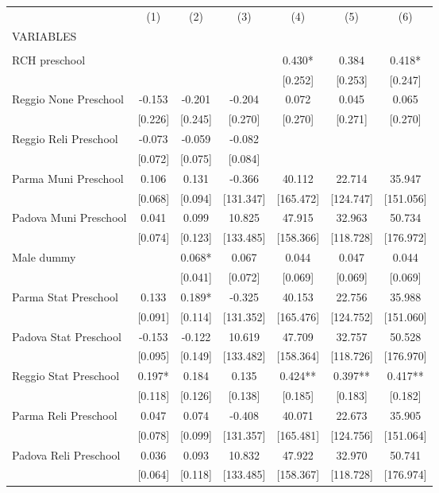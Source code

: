 \begin{tabular}{lcccccc} \hline
 & (1) & (2) & (3) & (4) & (5) & (6) \\
VARIABLES &  &  &  &  &  &  \\ \hline
 &  &  &  &  &  &  \\
RCH preschool &  &  &  & 0.430* & 0.384 & 0.418* \\
 &  &  &  & [0.252] & [0.253] & [0.247] \\
Reggio None Preschool & -0.153 & -0.201 & -0.204 & 0.072 & 0.045 & 0.065 \\
 & [0.226] & [0.245] & [0.270] & [0.270] & [0.271] & [0.270] \\
Reggio Reli Preschool & -0.073 & -0.059 & -0.082 &  &  &  \\
 & [0.072] & [0.075] & [0.084] &  &  &  \\
Parma Muni Preschool & 0.106 & 0.131 & -0.366 & 40.112 & 22.714 & 35.947 \\
 & [0.068] & [0.094] & [131.347] & [165.472] & [124.747] & [151.056] \\
Padova Muni Preschool & 0.041 & 0.099 & 10.825 & 47.915 & 32.963 & 50.734 \\
 & [0.074] & [0.123] & [133.485] & [158.366] & [118.728] & [176.972] \\
Male dummy &  & 0.068* & 0.067 & 0.044 & 0.047 & 0.044 \\
 &  & [0.041] & [0.072] & [0.069] & [0.069] & [0.069] \\
Parma Stat Preschool & 0.133 & 0.189* & -0.325 & 40.153 & 22.756 & 35.988 \\
 & [0.091] & [0.114] & [131.352] & [165.476] & [124.752] & [151.060] \\
Padova Stat Preschool & -0.153 & -0.122 & 10.619 & 47.709 & 32.757 & 50.528 \\
 & [0.095] & [0.149] & [133.482] & [158.364] & [118.726] & [176.970] \\
Reggio Stat Preschool & 0.197* & 0.184 & 0.135 & 0.424** & 0.397** & 0.417** \\
 & [0.118] & [0.126] & [0.138] & [0.185] & [0.183] & [0.182] \\
Parma Reli Preschool & 0.047 & 0.074 & -0.408 & 40.071 & 22.673 & 35.905 \\
 & [0.078] & [0.099] & [131.357] & [165.481] & [124.756] & [151.064] \\
Padova Reli Preschool & 0.036 & 0.093 & 10.832 & 47.922 & 32.970 & 50.741 \\
 & [0.064] & [0.118] & [133.485] & [158.367] & [118.728] & [176.974] \\

\end{tabular}

